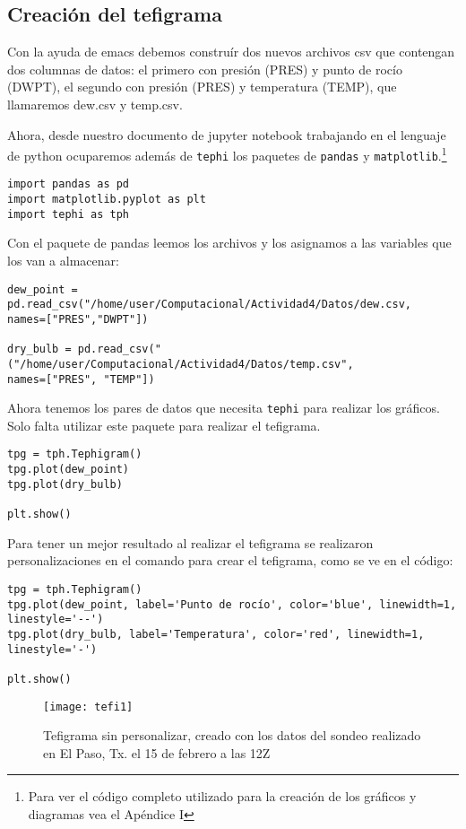 \subsection{Creación del tefigrama}
\noindent Con la ayuda de emacs debemos construír dos nuevos archivos csv que contengan dos columnas de datos: el primero con presión (PRES) y punto de rocío (DWPT), el segundo con presión (PRES) y temperatura (TEMP), que llamaremos dew.csv y temp.csv.

Ahora, desde nuestro documento de \textsf{jupyter notebook} trabajando en el lenguaje de python ocuparemos además de \texttt{tephi} los paquetes de \texttt{pandas} y \texttt{matplotlib}.\footnotesize\footnote{Para ver el código completo utilizado para la creación de los gráficos y diagramas vea el Apéndice I}

\begin{verbatim}
import pandas as pd
import matplotlib.pyplot as plt
import tephi as tph
\end{verbatim}

Con el paquete de pandas leemos los archivos y los asignamos a las variables que los van a almacenar: 
\begin{verbatim}
dew_point = pd.read_csv("/home/user/Computacional/Actividad4/Datos/dew.csv,
names=["PRES","DWPT"])

dry_bulb = pd.read_csv("("/home/user/Computacional/Actividad4/Datos/temp.csv",
names=["PRES", "TEMP"])
\end{verbatim}

Ahora tenemos los pares de datos que necesita \texttt{tephi} para realizar los gráficos. Solo falta utilizar este paquete para realizar el tefigrama. 
\begin{verbatim}
tpg = tph.Tephigram()
tpg.plot(dew_point)
tpg.plot(dry_bulb)

plt.show()
\end{verbatim}

Para tener un mejor resultado al realizar el tefigrama se realizaron personalizaciones en el comando para crear el tefigrama, como se ve en el código:

\begin{verbatim}
tpg = tph.Tephigram()
tpg.plot(dew_point, label='Punto de rocío', color='blue', linewidth=1, linestyle='--')
tpg.plot(dry_bulb, label='Temperatura', color='red', linewidth=1, linestyle='-')

plt.show()
\end{verbatim}
\pagebreak
\begin{figure}[ph!]
\texttt{[image: tefi1]}
\caption{Tefigrama sin personalizar, creado con los datos del sondeo realizado en El Paso, Tx. el 15 de febrero a las 12Z}
\label{teph1}
\end{figure}

